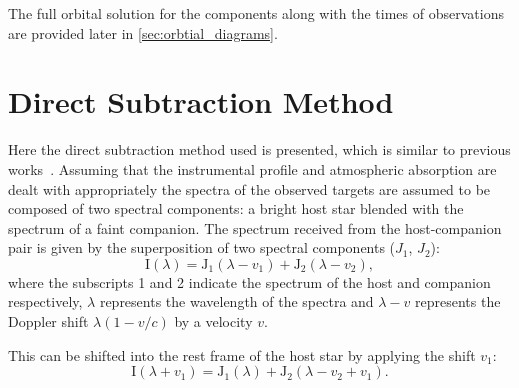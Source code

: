 

The full orbital solution for the components along with the times of observations are provided later in \cref{sec:orbtial_diagrams}.


\section{Direct Subtraction Method}
\label{sec:direct-subtraction}
Here the direct subtraction method used is presented, which is similar to previous works~\citep{ferluga_separating_1997, kostogryz_spectral_2013}.
Assuming that the instrumental profile and atmospheric absorption are dealt with appropriately the spectra of the observed targets are assumed to be composed of two spectral components:
a bright host star blended with the spectrum of a faint companion.
The spectrum received from the host-companion pair is given by the superposition of two spectral components (\(J_{1}\), \(J_{2}\)):
\begin{equation}
\textrm{I}(\lambda) = \textrm{J}_{1}(\lambda - v_{1}) + \textrm{J}_{2}(\lambda - v_{2}),
\end{equation}
where the subscripts 1 and 2 indicate the spectrum of the host and companion respectively, \(\lambda\) represents the wavelength of the spectra and \(\lambda-v\) represents the Doppler shift \(\lambda(1-v/c)\) by a velocity \(v\).

This can be shifted into the rest frame of the host star by applying the shift \(v_1\):
\begin{equation}
\textrm{I}(\lambda + v_{1}) = \textrm{J}_{1}(\lambda) + \textrm{J}_{2}(\lambda - v_{2} + v_{1}).
\end{equation}

